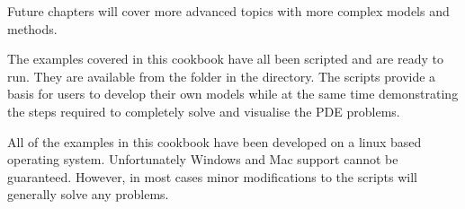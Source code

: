 Future chapters will cover more advanced topics with more complex models and methods.

The examples covered in this cookbook have all been scripted and are ready to run. They are available from the \exf folder in the \esc directory. The scripts provide a basis for users to develop their own models while at the same time demonstrating the steps required to completely solve and visualise the PDE problems.

All of the examples in this cookbook have been developed on a linux based operating system. Unfortunately Windows and Mac support cannot be guaranteed. However, in most cases minor modifications to the scripts will generally solve any problems.



